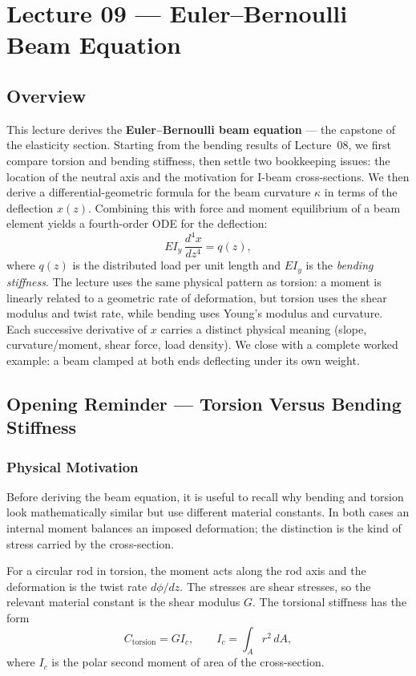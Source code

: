 \documentclass[../main.tex]{subfiles}
\begin{document}
\section{Lecture 09 — Euler–Bernoulli Beam Equation}\label{sec:lec09}
\date{May 6, 2026}

\subsection*{Overview}
This lecture derives the \textbf{Euler--Bernoulli beam equation} — the capstone of the elasticity section. Starting from the bending results of Lecture~08, we first compare torsion and bending stiffness, then settle two bookkeeping issues: the location of the neutral axis and the motivation for I-beam cross-sections. We then derive a differential-geometric formula for the beam curvature $\kappa$ in terms of the deflection $x(z)$. Combining this with force and moment equilibrium of a beam element yields a fourth-order ODE for the deflection:
\[
  EI_y\,\frac{d^4x}{dz^4} = q(z),
\]
where $q(z)$ is the distributed load per unit length and $EI_y$ is the \emph{bending stiffness}. The lecture uses the same physical pattern as torsion: a moment is linearly related to a geometric rate of deformation, but torsion uses the shear modulus and twist rate, while bending uses Young's modulus and curvature. Each successive derivative of $x$ carries a distinct physical meaning (slope, curvature/moment, shear force, load density). We close with a complete worked example: a beam clamped at both ends deflecting under its own weight.

\subsection*{Opening Reminder — Torsion Versus Bending Stiffness}

\subsubsection*{Physical Motivation}
Before deriving the beam equation, it is useful to recall why bending and torsion look mathematically similar but use different material constants. In both cases an internal moment balances an imposed deformation; the distinction is the kind of stress carried by the cross-section.

For a circular rod in torsion, the moment acts along the rod axis and the deformation is the twist rate $d\phi/dz$. The stresses are shear stresses, so the relevant material constant is the shear modulus $G$. The torsional stiffness has the form
\begin{equation}
  C_{\mathrm{torsion}} = G I_c,
  \qquad
  I_c = \int_A r^2\,dA,
  \label{eq:lec09_torsion_review}
\end{equation}
where $I_c$ is the polar second moment of area of the cross-section.
\end{document}
